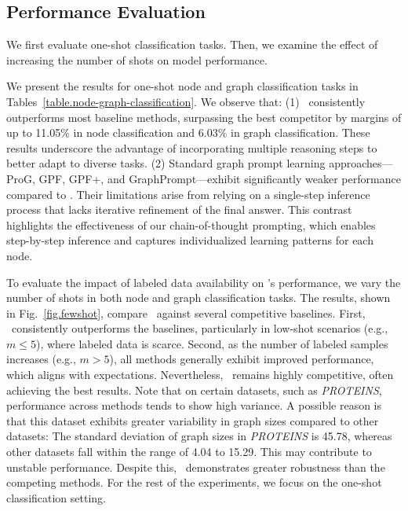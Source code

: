 \subsection{Performance Evaluation}\label{sec.exp.per}
We first evaluate one-shot classification tasks. Then, we examine the effect of increasing the number of shots on model performance.

\label{exp.main}
We present the results for one-shot node and graph classification tasks in Tables~\ref{table.node-graph-classification}. We observe that:
(1) \model\ consistently outperforms most baseline methods, surpassing the best competitor by margins of up to 11.05\% in node classification and 6.03\% in graph classification. These results underscore the advantage of incorporating multiple reasoning steps to better adapt to diverse tasks.
(2) Standard graph prompt learning approaches---ProG, GPF, GPF+, and GraphPrompt---exhibit significantly weaker performance compared to \model. Their limitations arise from relying on a single-step inference process that lacks iterative refinement of the final answer. This contrast highlights the effectiveness of our chain-of-thought prompting, which enables step-by-step inference and captures individualized learning patterns for each node.

To evaluate the impact of labeled data availability on \model's performance, we vary the number of shots in both node and graph classification tasks. The results, shown in Fig.~\ref{fig.fewshot}, compare \model\ against several competitive baselines.
First, \model\ consistently outperforms the baselines, particularly in low-shot scenarios (e.g., \( m \leq 5 \)), where labeled data is scarce. Second, as the number of labeled samples increases (e.g., \( m > 5 \)), all methods generally exhibit improved performance, which aligns with expectations. Nevertheless, \model\ remains highly competitive, often achieving the best results.
Note that on certain datasets, such as \emph{PROTEINS}, performance across methods tends to show high variance. A possible reason is that this dataset exhibits greater variability in graph sizes compared to other datasets: The standard deviation of graph sizes in \emph{PROTEINS} is 45.78, whereas other datasets fall within the range of 4.04 to 15.29. This may contribute to unstable performance.
Despite this, \model\ demonstrates greater robustness than the competing methods. For the rest of the experiments, we focus on the one-shot classification setting.



